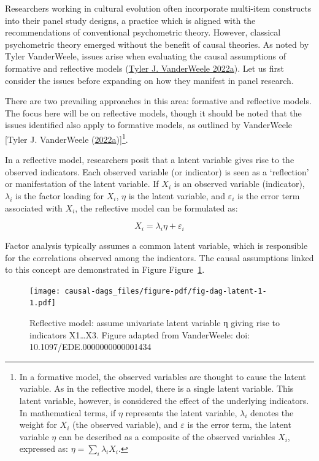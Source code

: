 \documentclass[
  singlecolumn]{report}
\begin{document}
Researchers working in cultural evolution often incorporate multi-item
constructs into their panel study designs, a practice which is aligned
with the recommendations of conventional psychometric theory. However,
classical psychometric theory emerged without the benefit of causal
theories. As noted by Tyler VanderWeele, issues arise when evaluating
the causal assumptions of formative and reflective models
(\protect\hyperlink{ref-vanderweele2022}{Tyler J. VanderWeele 2022a}).
Let us first consider the issues before expanding on how they manifest
in panel research.

There are two prevailing approaches in this area: formative and
reflective models. The focus here will be on reflective models, though
it should be noted that the issues identified also apply to formative
models, as outlined by VanderWeele {[}Tyler J. VanderWeele
(\protect\hyperlink{ref-vanderweele2022}{2022a}){]}\footnote{In a
  formative model, the observed variables are thought to cause the
  latent variable. As in the reflective model, there is a single latent
  variable. This latent variable, however, is considered the effect of
  the underlying indicators. In mathematical terms, if \(\eta\)
  represents the latent variable, \(\lambda_i\) denotes the weight for
  \(X_i\) (the observed variable), and \(\varepsilon\) is the error
  term, the latent variable \(\eta\) can be described as a composite of
  the observed variables \(X_i\), expressed as:
  \(\eta = \sum_i\lambda_i X_i\).}.

In a reflective model, researchers posit that a latent variable gives
rise to the observed indicators. Each observed variable (or indicator)
is seen as a `reflection' or manifestation of the latent variable. If
\(X_i\) is an observed variable (indicator), \(\lambda_i\) is the factor
loading for \(X_i\), \(\eta\) is the latent variable, and
\(\varepsilon_i\) is the error term associated with \(X_i\), the
reflective model can be formulated as:

\[X_i = \lambda_i \eta + \varepsilon_i\]

Factor analysis typically assumes a common latent variable, which is
responsible for the correlations observed among the indicators. The
causal assumptions linked to this concept are demonstrated in Figure
Figure~\ref{fig-dag-latent-1}.

\begin{figure}

{\centering \texttt{[image: causal-dags\_files/figure-pdf/fig-dag-latent-1-1.pdf]}

}

\caption{\label{fig-dag-latent-1}Reflective model: assume univariate
latent variable η giving rise to indicators X1\ldots X3. Figure adapted
from VanderWeele: doi: 10.1097/EDE.0000000000001434}

\end{figure}
\end{document}
